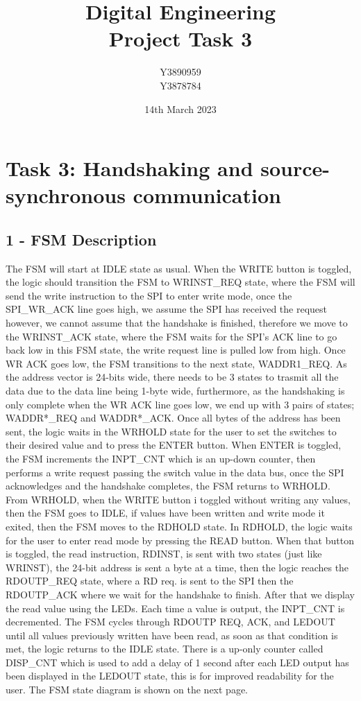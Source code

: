 \documentclass[11pt]{report}
\title{Digital Engineering\\Project Task 3}
\author{Y3890959\\Y3878784}
\date{14th March 2023}
\begin{document}
\maketitle

\chapter*{Task 3: Handshaking and source-synchronous communication}

\section*{1 - FSM Description}

The FSM will start at IDLE state as usual. When the WRITE button is toggled, the logic should transition the
FSM to WRINST\_REQ state, where the FSM will send the write instruction to the SPI to enter write mode, once
the SPI\_WR\_ACK line goes high, we assume the SPI has received the request however, we cannot assume that the
handshake is finished, therefore we move to the WRINST\_ACK state, where the FSM waits for the SPI's ACK
line to go back low in this FSM state, the write request line is pulled low from high. Once WR ACK goes low,
the FSM transitions to the next state, WADDR1\_REQ. As the address vector is 24-bits wide, there needs to be 3
states to trasmit all the data due to the data line being 1-byte wide, furthermore, as the handshaking is only
complete when the WR ACK line goes low, we end up with 3 pairs of states; WADDR*\_REQ and WADDR*\_ACK. Once
all bytes of the address has been sent, the logic waits in the WRHOLD state for the user to set the switches
to their desired value and to press the ENTER button. When ENTER is toggled, the FSM increments the INPT\_CNT 
which is an up-down counter, then performs a write request passing the switch value in the data bus, once the
SPI acknowledges and the handshake completes, the FSM returns to WRHOLD. From WRHOLD, when the WRITE button i
toggled without writing any values, then the FSM goes to IDLE, if values have been written and write mode it
exited, then the FSM moves to the RDHOLD state. In RDHOLD, the logic waits for the user to enter read mode by
pressing the READ button. When that button is toggled, the read instruction, RDINST, is sent with two states
(just like WRINST), the 24-bit address is sent a byte at a time, then the logic reaches the RDOUTP\_REQ state,
where a RD req. is sent to the SPI then the RDOUTP\_ACK where we wait for the handshake to finish. After that
we display the read value using the LEDs. Each time a value is output, the INPT\_CNT is decremented. The FSM
cycles through RDOUTP REQ, ACK, and LEDOUT until all values previously written have been read, as soon as that
condition is met, the logic returns to the IDLE state. There is a up-only counter called DISP\_CNT which is
used to add a delay of 1 second after each LED output has been displayed in the LEDOUT state, this is for
improved readability for the user. The FSM state diagram is shown on the next page.
\end{document}
